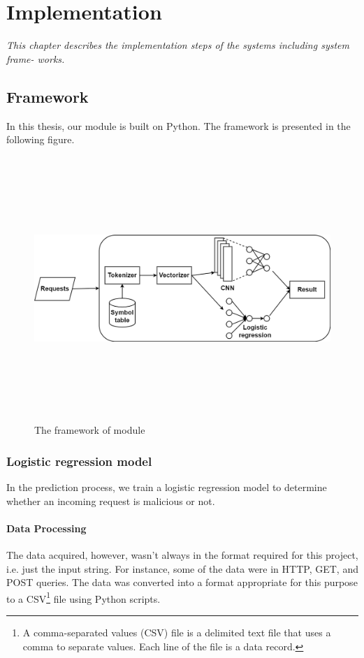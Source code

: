 \chapter{Implementation}
\label{chap:implementation}
	\textit{\hspace{0.5cm}This chapter describes the implementation steps of the systems including system frame- works.}
\minitoc


\section{Framework}
\label{sec:framework}
\hspace{0.5cm}In this thesis, our module is built on Python. The framework is presented in the following figure.

\begin{figure}[!h]
	\centering
	\includegraphics[width=\linewidth, height=10cm,keepaspectratio]{figures/Untitled Diagram.drawio (1).png}
  \caption{The framework of module}
\end{figure} 

\subsection{Logistic regression model}
\hspace{0.5cm}In the prediction process, we train a logistic regression model to determine whether an incoming request is malicious or not.
\subsubsection{Data Processing}
\hspace{0.5cm}The data acquired, however, wasn't always in the format required for this project, i.e. just the input string. For instance, some of the data were in HTTP, GET, and POST queries. The data was converted into a format appropriate for this purpose to a CSV\footnote{A comma-separated values (CSV) file is a delimited text file that uses a comma to separate values. Each line of the file is a data record.} file using Python scripts.
